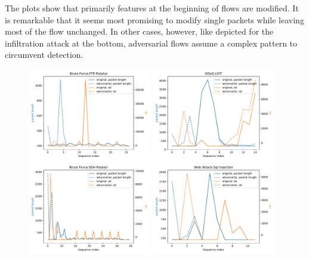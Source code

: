 \documentclass[sigconf,nonacm]{acmart}
\begin{document}
The plots show that primarily features at the beginning of flows are modified. It is remarkable that it seems most promising to modify single packets while leaving most of the flow unchanged. In other cases, however, like depicted for the infiltration attack at the bottom, adversarial flows assume a complex pattern to circumvent detection.

\begin{figure}[p]
\includegraphics[width=0.48\textwidth]{../plots/plot_adv/1.pdf}
\includegraphics[width=0.48\textwidth]{../plots/plot_adv/2.pdf}
\includegraphics[width=0.48\textwidth]{../plots/plot_adv/3.pdf}
\includegraphics[width=0.48\textwidth]{../plots/plot_adv/4.pdf}

\end{figure}
\end{document}

